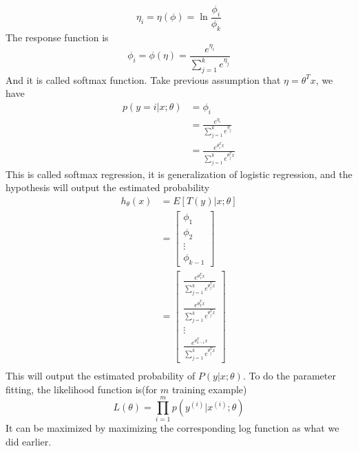 \documentclass[10pt,a4paper,oneside]{article}
\begin{document}
\[
\eta_i = \eta(\phi) = \ln \frac{\phi_i}{\phi_k}
\]
The response function is
\[
\phi_i = \phi(\eta) =  \frac{e^{\eta_i}}{\sum_{j=1}^{k} e^{\eta_j}}
\]
And it is called softmax function. Take previous assumption that $\eta = \theta^T x$, we have
\begin{align*}
p(y=i | x; \theta) &= \phi_i\\
&=  \frac{e^{\eta_i}}{\sum_{j=1}^{k} e^{\eta_j}}\\
&=  \frac{e^{\theta_i ^T x}}{\sum_{j=1}^{k} e^{\theta_j ^T x}}
\end{align*}
This is called softmax regression, it is generalization of logistic regression, and the hypothesis will output the estimated probability
\begin{align*}
h_\theta(x) &= E[T(y)|x; \theta]\\
&= \begin{bmatrix}
\phi_1 \\ 
\phi_2 \\ 
\vdots \\ 
\phi_{k-1}
\end{bmatrix} \\
&=\begin{bmatrix}
\frac{e^{\theta_1 ^T x}}{\sum_{j=1}^{k} e^{\theta_j ^T x}} \\ 
\frac{e^{\theta_2 ^T x}}{\sum_{j=1}^{k} e^{\theta_j ^T x}} \\ 
\vdots \\ 
 \frac{e^{\theta_{k-1} ^T x}}{\sum_{j=1}^{k} e^{\theta_j ^T x}}
\end{bmatrix} \\ 
\end{align*}
This will output the estimated probability of $P(y|x; \theta)$. To do the parameter fitting, the likelihood function is(for $m$ training example)
\[
L(\theta) = \prod_{i=1}^{m} p(y^{(i)}|x^{(i)}; \theta)
\]
It can be maximized by maximizing the corresponding log function as what we did earlier.
\end{document}
